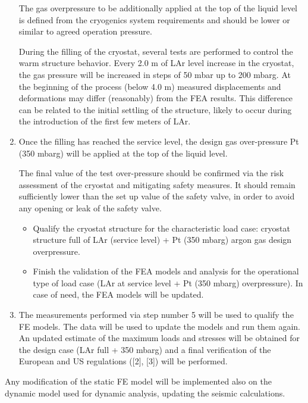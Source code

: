 \begin{enumerate}
The gas overpressure to be additionally applied at the top of the liquid level is defined from the cryogenics system requirements and should be lower or similar to agreed operation pressure. 

During the filling of the cryostat, several tests are performed to control the warm structure behavior. Every 2.0 m of LAr level increase in the cryostat, the gas pressure will be increased in steps of 50 mbar up to 200 mbarg. At the beginning of the process (below 4.0 m) measured displacements and deformations may differ (reasonably) from the FEA results. This difference can be related to the initial settling of the structure, likely to occur during the introduction of the first few meters of LAr.

    \item Once the filling has reached the service level, the design gas over-pressure Pt (350 mbarg) will be applied at the top of the liquid level. 
    
The final value of the test over-pressure should be confirmed via the risk assessment of the cryostat and mitigating safety measures. It should remain sufficiently lower than the set up value of the safety valve, in order to avoid any opening or leak of the safety valve. 

    \begin{itemize}
        \item Qualify the cryostat structure for the characteristic load case: cryostat structure full of LAr (service level) + Pt (350 mbarg) argon gas design overpressure. 
        \item Finish the validation of the FEA models and analysis for the operational type of load case (LAr at service level + Pt (350 mbarg) overpressure). In case of need, the FEA models will be updated. 
    \end{itemize}

    \item The measurements performed via step number 5 will be used to qualify the FE models. The data will be used to update the models and run them again. An updated estimate of the maximum loads and stresses will be obtained for the design case (LAr full + 350 mbarg) and a final verification of the European and US regulations ([2], [3]) will be performed.

\end{enumerate}

Any modification of the static FE model will be implemented also on the dynamic model used for dynamic analysis, updating the seismic calculations.

